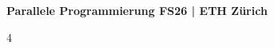 \documentclass[8pt,landscape]{extarticle}
\begin{document}
{\large \textbf{Parallele Programmierung \hfill FS26 | ETH Zürich}} 

\begin{multicols*}{4}










\vfill\null
\end{multicols*}
\end{document}
